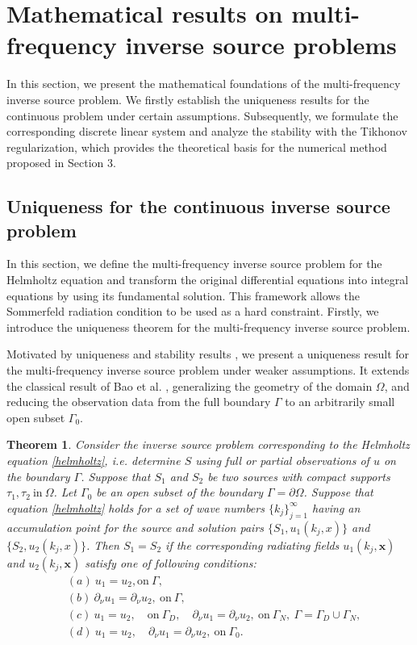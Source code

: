 \documentclass{article}
\theoremstyle{plain}
\newtheorem{theorem}{Theorem}[section]
\theoremstyle{definition}
\begin{document}
\section{Mathematical results on multi-frequency inverse source problems}
 {In this section, we present the mathematical foundations of the multi-frequency inverse source problem. We firstly establish the uniqueness results for the continuous problem under certain assumptions. Subsequently, we formulate the corresponding discrete linear system and analyze the stability with the Tikhonov regularization, which provides the theoretical basis for the numerical method proposed in Section 3.}
\subsection{Uniqueness for the continuous inverse source problem}
In this section, we define the multi-frequency inverse source problem for the Helmholtz equation and transform the original differential equations into integral equations by using its fundamental solution. This framework allows the Sommerfeld radiation condition to be used as a hard constraint. Firstly, we introduce the uniqueness theorem for the multi-frequency inverse source problem.

Motivated by uniqueness and stability results \cite{eller2009acoustic,bao2010multi,bleistein1977nonuniqueness}, 
we present a uniqueness result for the multi-frequency inverse source problem under weaker assumptions. It extends the classical result of Bao et al. \cite{bao2010multi},  generalizing the geometry of the domain $\Omega$, and reducing the observation data from the full boundary $\Gamma$ to an arbitrarily small open subset $\Gamma_0$. 
\begin{theorem}
\label{the:Uniqueness of multi-frequency data}
Consider the inverse source problem  {corresponding to the Helmholtz equation \eqref{helmholtz}, i.e. determine $S$ using full or partial observations of $u$ on the boundary $\Gamma$}. Suppose that $S_1$ and $S_2$ be two sources with compact supports $\tau_1,  \tau_2 \ \text{in}\  \Omega$. Let $\Gamma_0$ be an open subset of the boundary $\Gamma = \partial\Omega$. Suppose that  {equation \eqref{helmholtz} holds} for a set of wave numbers $\{k_j\}_{j=1}^{\infty}$ having an accumulation point  {for the source and solution pairs $\{ S_1, u_1(k_j, x)\}$ and $\{ S_2, u_2(k_j, x) \}$}. Then $S_1=S_2$ if the corresponding radiating fields $u_1(k_j,  \boldsymbol{x})$ and $u_2(k_j,  \boldsymbol{x})$ satisfy one of following conditions: 
\begin{align}
 &(a) \ u_1=u_2,  \text{on} \ \Gamma,   \\
 &(b) \ \partial_{\nu} u_1 =\partial_{\nu}u_2,  \ \text{on}\  \Gamma,  \\
&(c) \ u_1=u_2, \quad \text{on} \  \Gamma_{D},  \quad \partial_{\nu} u_1 =\partial_{\nu}u_2,  \ \text{on} \ \Gamma_N,  \  \Gamma=\Gamma_D\cup\Gamma_N, \\
 &(d) \  u_1=u_2,  \quad \partial_{\nu} u_1 =\partial_{\nu}u_2,  \ \text{on} \ \Gamma_0.
\end{align}
\end{theorem}
\end{document}
